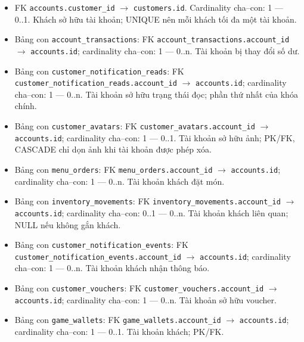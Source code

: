 \begin{itemize}

\item FK \texttt{accounts.customer\_id} $\rightarrow$ \texttt{customers.id}. Cardinality cha--con: 1 — 0..1. Khách sở hữu tài khoản; UNIQUE nên mỗi khách tối đa một tài khoản.

\item Bảng con \texttt{account\_transactions}: FK \texttt{account\_transactions.account\_id} $\rightarrow$ \texttt{accounts.id}; cardinality cha--con: 1 — 0..n. Tài khoản bị thay đổi số dư.

\item Bảng con \texttt{customer\_notification\_reads}: FK \texttt{customer\_notification\_reads.account\_id} $\rightarrow$ \texttt{accounts.id}; cardinality cha--con: 1 — 0..n. Tài khoản sở hữu trạng thái đọc; phần thứ nhất của khóa chính.

\item Bảng con \texttt{customer\_avatars}: FK \texttt{customer\_avatars.account\_id} $\rightarrow$ \texttt{accounts.id}; cardinality cha--con: 1 — 0..1. Tài khoản sở hữu ảnh; PK/FK, CASCADE chỉ dọn ảnh khi tài khoản được phép xóa.

\item Bảng con \texttt{menu\_orders}: FK \texttt{menu\_orders.account\_id} $\rightarrow$ \texttt{accounts.id}; cardinality cha--con: 1 — 0..n. Tài khoản khách đặt món.

\item Bảng con \texttt{inventory\_movements}: FK \texttt{inventory\_movements.account\_id} $\rightarrow$ \texttt{accounts.id}; cardinality cha--con: 0..1 — 0..n. Tài khoản khách liên quan; NULL nếu không gắn khách.

\item Bảng con \texttt{customer\_notification\_events}: FK \texttt{customer\_notification\_events.account\_id} $\rightarrow$ \texttt{accounts.id}; cardinality cha--con: 1 — 0..n. Tài khoản khách nhận thông báo.

\item Bảng con \texttt{customer\_vouchers}: FK \texttt{customer\_vouchers.account\_id} $\rightarrow$ \texttt{accounts.id}; cardinality cha--con: 1 — 0..n. Tài khoản sở hữu voucher.

\item Bảng con \texttt{game\_wallets}: FK \texttt{game\_wallets.account\_id} $\rightarrow$ \texttt{accounts.id}; cardinality cha--con: 1 — 0..1. Tài khoản khách; PK/FK.


\end{itemize}
